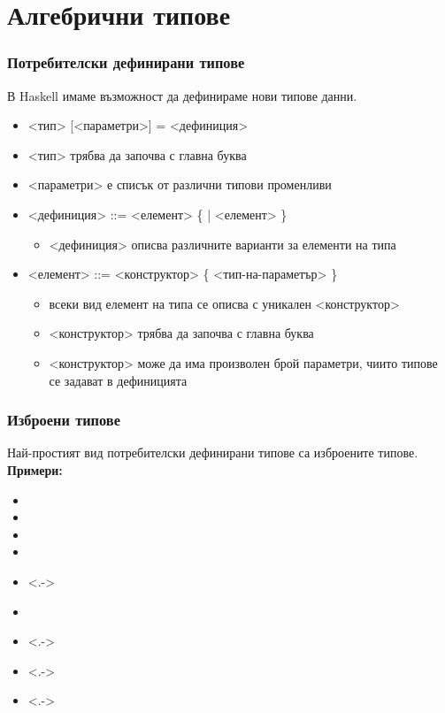 \documentclass[alsotrans]{beamerswitch}
\begin{document}
\section{Алгебрични типове}

\begin{frame}
  \frametitle{Потребителски дефинирани типове}
  В Haskell имаме възможност да дефинираме нови типове данни.\\[1em]
  \begin{itemize}[<+->]
  \item {} <тип> [<параметри>] \tta= <дефиниция>
  \item{} <тип> трябва да започва с главна буква
  \item{} <параметри> е списък от различни типови променливи
  \item{} <дефиниция> ::= <елемент> \{ \tta| <елемент> \}
    \begin{itemize}
    \item{} <дефиниция> описва различните варианти за елементи на типа
    \end{itemize}
  \item{} <елемент> ::= <конструктор> \{ <тип-на-параметър> \}
    \begin{itemize}
    \item всеки вид елемент на типа се описва с уникален <конструктор>
    \item{} <конструктор> трябва да започва с главна буква
    \item{} <конструктор> може да има произволен брой параметри, чиито типове се задават в дефиницията
    \end{itemize}
  \end{itemize}
\end{frame}

\begin{frame}
  \frametitle{Изброени типове}
  Най-простият вид потребителски дефинирани типове са \alert{изброените типове}.\\[1em]
  \pause
  \textbf{Примери:}
  \begin{itemize}[<+->]
  \item {}
  \item {}
  \item {}
  \item {}
  \item<.-> 
  \item {}
  \item<.-> 
  \item<.-> 
  \item<.-> 
  \end{itemize}
\end{frame}
\end{document}
